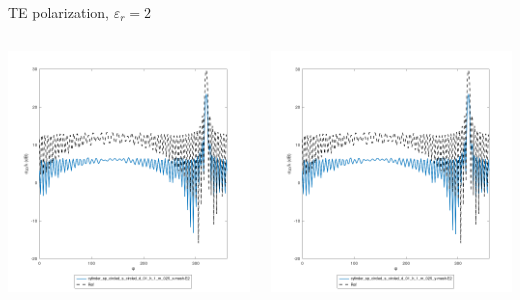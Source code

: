 
\begin{frame}{TE polarization, $\varepsilon_r=2$}

\begin{columns}

\includegraphics[width=\linewidth]{results/FF/cylD_01_H_1_M_025_X/epr2_TE.png}


\includegraphics[width=\linewidth]{results/FF/cylD_01_H_1_M_025_Y/epr2_TE.png}


\end{columns}
\end{frame}
